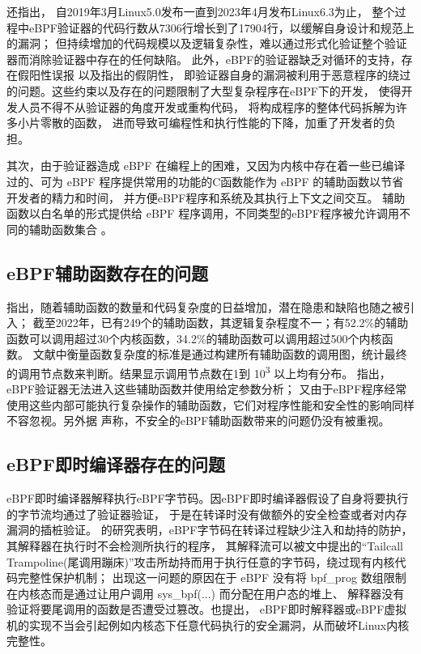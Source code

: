 \documentclass[12pt,a4paper]{article}
\begin{document}
\begin{sloppypar}
\begin{CJK*}{UTF8}{song}
	\textcite[2]{limUnleashingUnprivilegedEBPF2023}还指出，
	自2019年3月Linux5.0发布一直到2023年4月发布Linux6.3为止，
	整个过程中eBPF验证器的代码行数从7306行增长到了17904行，以缓解自身设计和规范上的漏洞；
	但持续增加的代码规模以及逻辑复杂性，难以通过形式化验证整个验证器而消除验证器中存在的任何缺陷。
	此外，eBPF的验证器缺乏对循环的支持\cite{gershuniSimplePreciseStatic2019}，存在假阳性误报
	\cite{hive,gershuniSimplePreciseStatic2019}以及\textcite[2,5,6]{PKSeBPFIsolation}指出的假阴性，
	即验证器自身的漏洞被利用于恶意程序的绕过的问题。这些约束以及存在的问题限制了大型复杂程序在eBPF下的开发，
	使得开发人员不得不从验证器的角度开发\cite{PKSeBPFIsolation}或重构\cite{HaoValidating}代码，
	将构成程序的整体代码拆解为许多小片零散的函数\cite{AcceleratingMemcachedUsingSafeinKernCache}，
	进而导致可编程性和执行性能的下降\cite{kuoVerifiedProgramsCan2022}，加重了开发者的负担。

	其次，由于验证器造成 eBPF 在编程上的困难，又因为内核中存在着一些已编译过的、可为 eBPF
	程序提供常用的功能的C函数能作为 eBPF 的辅助函数以节省开发者的精力和时间\cite{FuzzOnEBPF}，
	并方便eBPF程序和系统及其执行上下文之间交互\cite{gbadamosiEBPFRuntimeLinux2024}。
	辅助函数以白名单的形式提供给 eBPF 程序调用，不同类型的eBPF程序被允许调用不同的辅助函数集合
	\cite{isovalentEBPFDocs2024, FuzzOnEBPF}。
	\subsection{eBPF辅助函数存在的问题}
	\textcite{jiaKernelExtensionVerification2023}指出，随着辅助函数的数量和代码复杂度的日益增加，潜在隐患和缺陷也随之被引入；
	截至2022年，已有249个的辅助函数，其逻辑复杂程度不一；有52.2\%的辅助函数可以调用超过30个内核函数，34.2\%的辅助函数可以调用超过500个内核函数。
	文献中衡量函数复杂度的标准是通过构建所有辅助函数的调用图，统计最终的调用节点数来判断。结果显示调用节点数在1到
	10\textsuperscript{3} 以上均有分布。
	\textcite[3]{sahuEnablingBPFRuntime2023}指出，eBPF验证器无法进入这些辅助函数并使用给定参数分析；
	又由于eBPF程序经常使用这些内部可能执行复杂操作的辅助函数，它们对程序性能和安全性的影响同样不容忽视。另外据
	\textcite[4]{jiaKernelExtensionVerification2023}声称，不安全的eBPF辅助函数带来的问题仍没有被重视。
	\subsection{eBPF即时编译器存在的问题}
	eBPF即时编译器解释执行eBPF字节码。因eBPF即时编译器假设了自身将要执行的字节流均通过了验证器验证，
	于是在转译时没有做额外的安全检查\cite{gershuniSimplePreciseStatic2019}或者对内存漏洞的插桩验证\cite[5]{sunFindingCorrectnessBugs2024}。
	\textcite{interpreterhijeck}的研究表明，eBPF字节码在转译过程缺少注入和劫持的防护，其解释器在执行时不会检测所执行的程序，
	其解释流可以被文中提出的“Tailcall Trampoline(尾调用蹦床)”攻击所劫持而用于执行任意的字节码，绕过现有内核代码完整性保护机制；
	出现这一问题的原因在于 eBPF 没有将 bpf\_prog 数组限制在内核态而是通过让用户调用 sys\_bpf(...) 而分配在用户态的堆上、
	解释器没有验证将要尾调用的函数是否遭受过篡改。\textcite[2]{ProofofJITeBPFvmForIoT}也提出，
	eBPF即时解释器或eBPF虚拟机的实现不当会引起例如内核态下任意代码执行的安全漏洞，从而破坏Linux内核完整性。


\end{CJK*}
\end{sloppypar}
\end{document}
